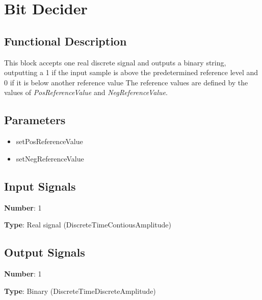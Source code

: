 \section{Bit Decider}

\subsection*{Functional Description}

This block accepts one real discrete signal and outputs a binary string, outputting a 1 if the input sample is above the predetermined reference level and 0 if it is below another reference value The reference values are defined by the values of \textit{PosReferenceValue} and \textit{NegReferenceValue}.


\subsection*{Parameters}

\begin{multicols}{2}
	\begin{itemize}
		\item setPosReferenceValue
		\item setNegReferenceValue
	\end{itemize}
\end{multicols}

\subsection*{Input Signals}

\textbf{Number}: 1

\textbf{Type}: Real signal (DiscreteTimeContiousAmplitude)

\subsection*{Output Signals}

\textbf{Number}: 1

\textbf{Type}: Binary (DiscreteTimeDiscreteAmplitude)